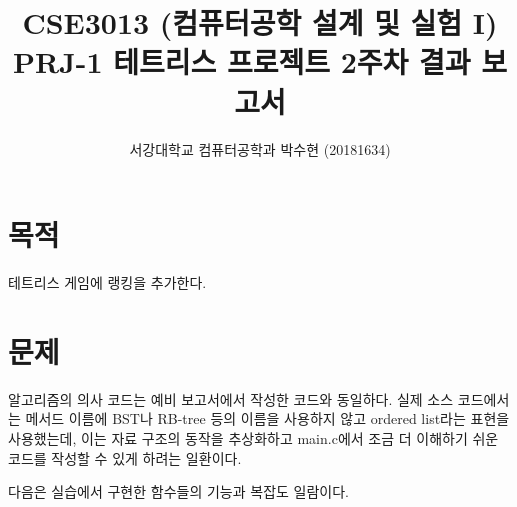 
    
\usepackage{subfig}



\title{CSE3013 (컴퓨터공학 설계 및 실험 I) \space \newline PRJ-1 테트리스 프로젝트 2주차 결과 보고서}
\author{서강대학교 컴퓨터공학과 박수현 (20181634)}
\maketitle

\section{목적}
테트리스 게임에 랭킹을 추가한다.

\section{문제}
알고리즘의 의사 코드는 예비 보고서에서 작성한 코드와 동일하다. 실제 소스 코드에서는 메서드 이름에 BST나 RB-tree 등의 
이름을 사용하지 않고 ordered list라는 표현을 사용했는데, 이는 자료 구조의 동작을 추상화하고 main.c에서 조금 더 이해하기 쉬운 코드를 작성할 수 있게 하려는 일환이다. 

\newpage

다음은 실습에서 구현한 함수들의 기능과 복잡도 일람이다. 

